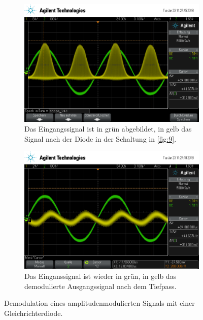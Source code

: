 \begin{figure}[t!]
	\centering
	\begin{subfigure}[t]{0.48\textwidth}
		\centering
		\includegraphics[width=\textwidth]{img/g_scope_243.png}
		\caption{Das Eingangssignal ist in grün abgebildet, in gelb das Signal nach der Diode in der Schaltung in \autoref{fig:9}.}
		\label{nachDiode}
	\end{subfigure}\hfill%
	\begin{subfigure}[t]{0.48\textwidth}
		\centering
		\includegraphics[width=\textwidth]{img/g_scope_242.png}
		\caption{Das Einganssignal ist wieder in grün, in gelb das demodulierte Ausgangssignal nach dem Tiefpass.}
		\label{nachRC}
	\end{subfigure}
	\caption{Demodulation eines amplitudenmodulierten Signals mit einer Gleichrichterdiode.}
\end{figure}

